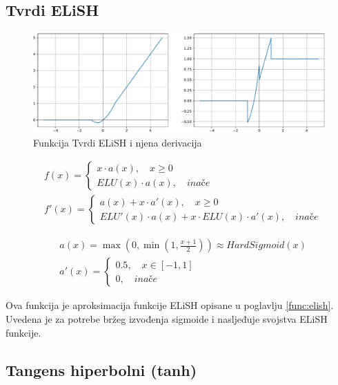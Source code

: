 \documentclass[times, utf8, diplomski]{fer}
\def\otherwise{\textit{inače}}
\begin{document}
\subsection{Tvrdi ELiSH}
\label{func:hard_elish}

\begin{figure}[H]
\includegraphics[width=\textwidth]{Hard_ELiSH.pdf}
\centering
\caption{Funkcija Tvrdi ELiSH i njena derivacija}
\label{fig:hard_elish}
\end{figure}

\begin{equation}
\begin{split}
&f(x) =
	\begin{cases}
		x \cdot a(x), \quad x \geq 0 \\
		ELU(x) \cdot a(x), \quad \otherwise
	\end{cases} \\
&f'(x) = \begin{cases}
	a(x) + x \cdot a'(x), \quad x \geq 0 \\
	ELU'(x) \cdot a(x) + x \cdot ELU(x) \cdot a'(x), \quad \otherwise
\end{cases}
\end{split}
\end{equation}

\begin{equation}
\begin{split}
&a(x) = \max(0, \min(1, \frac{x+1}{2})) \approx HardSigmoid(x) \\
&a'(x) =
\begin{cases}
	0.5, \quad x \in [-1,1] \\
	0, \quad \otherwise
\end{cases}	
\end{split}
\end{equation}

Ova funkcija je aproksimacija funkcije ELiSH opisane u poglavlju \ref{func:elish}. Uvedena je za potrebe bržeg izvođenja sigmoide i nasljeđuje svojstva ELiSH funkcije.

\subsection{Tangens hiperbolni (tanh)}
\label{func:tanh}
\end{document}
